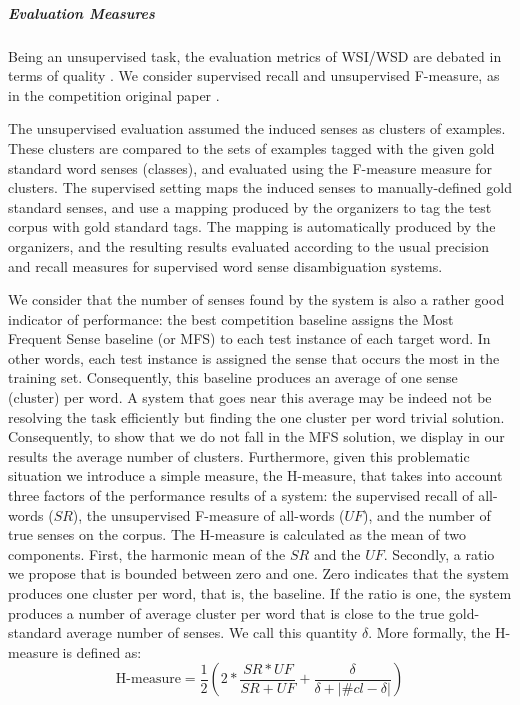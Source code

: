 \subparagraph{Evaluation Measures}
Being an unsupervised task, the evaluation metrics of WSI/WSD are debated in terms of quality \cite{CruysA11}. We consider supervised recall and unsupervised F-measure, as in the competition original paper \cite{Agirre2007}. 

The unsupervised evaluation assumed the induced senses as clusters of examples. These clusters are compared to the sets of examples tagged with the given gold standard word senses (classes), and evaluated using the F-measure measure for clusters. The supervised setting maps the induced senses to manually-defined gold standard senses, and use a mapping produced by the organizers to tag the test corpus with gold standard tags. The mapping is automatically produced by the organizers, and the resulting results evaluated according to the usual precision and recall measures for supervised word sense disambiguation systems. 


We consider that the number of senses found by the system is also a rather good indicator of performance: the best competition baseline assigns the Most Frequent Sense baseline (or MFS) to each test instance of each target word. In other words, each test instance is assigned the sense that occurs the most in the training set. Consequently, this baseline produces an average of one sense (cluster) per word. A system that goes near this average may be indeed not be resolving the task efficiently but finding the one cluster per word trivial solution. Consequently, to show that we do not fall in the MFS solution, we display in our results the average number of clusters. Furthermore, given this problematic situation we introduce a simple measure, the H-measure, that takes into account three factors of the performance results of a system: the supervised recall of all-words ($SR$), the unsupervised F-measure of all-words ($UF$), and the number of true senses on the corpus. The H-measure is calculated as the mean of two components. First, the harmonic mean of the $SR$ and the $UF$. Secondly, a ratio we propose that is bounded between zero and one. Zero indicates that the system produces one cluster per word, that is, the baseline. If the ratio is one, the system produces a number of average cluster per word that is close to the true gold-standard average number of senses. We call this quantity $\delta$. More formally, the H-measure is defined as:
\begin{equation}
\text{H-measure} = \dfrac{1}{2}\left(2*\dfrac{SR*UF}{SR+UF}+\dfrac{\delta}{\delta+|\#cl-\delta|}\right)
\end{equation}

